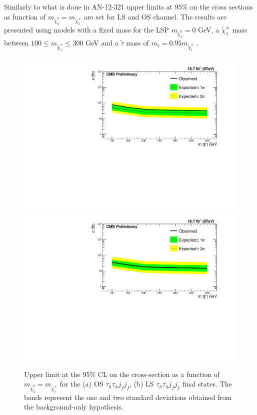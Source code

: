 Similarly to what is done in AN-12-321 upper limits at $95\%$ on the cross sections as function of $m_{\tilde{\chi}_{2}^{0}}=m_{\tilde{\chi}_{1}^{\pm}}$ are set for LS and OS channel. The results are presented using models with a fixed mass for the LSP $m_{\tilde{\chi}_{1}^{0}} = 0 $ GeV, a $\tilde{\chi}_{1}^{\pm}$ mass between $100 \leq m_{\tilde{\chi}_{1}^{\pm}} \leq 300$ GeV and a $\tilde{\tau}$ mass of $m_{\tilde{\tau}} = 0.95 m_{\tilde{\chi}_{1}^{\pm}}$ .

\begin{figure}
  \begin{center}
    \includegraphics[angle=0,width=.48\textwidth, height=0.35\textheight]{PLOTS/Limit_VBF_diTau_OS.pdf}
    \includegraphics[angle=0,width=.48\textwidth, height=0.35\textheight]{PLOTS/Limit_VBF_diTau_LS.pdf}
    \caption{Upper limit at the 95\% CL on the cross-section as a function of 
$m_{\tilde{\chi}_{2}^{0}}=m_{\tilde{\chi}_{1}^{\pm}}$ for the (a) OS 
$\tau_{h}\tau_{h} j_{f} j_{f}$, (b) LS $\tau_{h}\tau_{h} j_{f} j_{f}$
final states. The bands represent the one and two standard deviations obtained from the background-only hypothesis.}
  \label{fig:LimitsOSLS}
 \end{center}
\end{figure}

